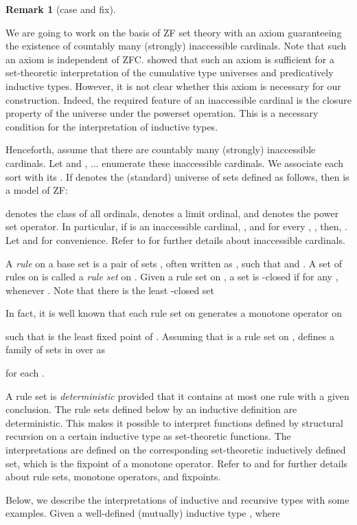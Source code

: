 \documentclass{LMCS}
\theoremstyle{plain}
\theoremstyle{definition}
\newtheorem{remm}[thm]{Remark}
\begin{document}
\begin{remm}[\textsf{case} and \textsf{fix}]
\begin{enumerate}[(1)]
We are going to work on the basis of ZF set theory with an axiom guaranteeing the existence of countably many (strongly) inaccessible cardinals. Note that such an axiom is independent of ZFC. \cite{werner-set} showed that such an axiom is sufficient for a set-theoretic interpretation of the cumulative type universes and predicatively inductive types.
However, it is not clear whether this axiom is necessary for our construction. Indeed, the required feature of an inaccessible cardinal  is the closure property of the universe  under the powerset operation. This is a necessary condition for the interpretation of inductive types.

Henceforth, assume that there are countably many (strongly) inaccessible cardinals. Let  and ,  ... enumerate these inaccessible cardinals. We associate each sort  with its . If  denotes the (standard) universe of sets defined as follows, then  is a model of ZF:

 denotes the class of all ordinals,  denotes a limit ordinal, and  denotes the power set operator. In particular, if  is an inaccessible cardinal, , and for every , , then, . Let  and  for convenience.  Refer to \cite{drake} for further details about inaccessible cardinals.

A \emph{rule} on a base set  is a pair of sets , often written as , such that  and . A set of rules on  is called a \emph{rule set} on . Given a rule set  on , a set  is -closed if for any ,  whenever . Note that there is the least -closed set

In fact, it is well known that each rule set  on  generates a monotone operator on 

such that  is the least fixed point of . Assuming that  is a rule set on ,  defines a family  of sets in  over  as

for each . 

A rule set is \emph{deterministic} provided that it contains at most one rule with a given conclusion. The rule sets  defined below by an inductive definition are deterministic. This makes it possible to interpret functions defined by structural recursion on a certain inductive type as set-theoretic functions. The interpretations are defined on the corresponding set-theoretic inductively defined set, which is the fixpoint of a monotone operator. Refer to \cite{aczel-induction} and \cite{moschovakis74,moschovakis} for further details about rule sets, monotone operators, and fixpoints.

Below, we describe the interpretations of inductive and recursive types with some examples. Given a well-defined (mutually) inductive type , where


\end{enumerate}
\end{remm}
\end{document}
